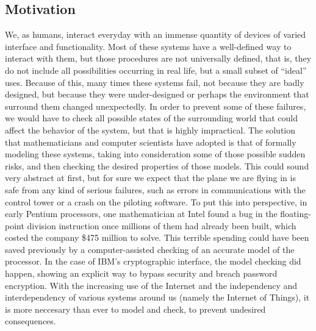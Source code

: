 \documentclass[11pt]{article}
\theoremstyle{definition}
\theoremstyle{plain}
\begin{document}
\subsection{Motivation}
We, as humans, interact everyday with an immense quantity of devices of varied interface and functionality. Most of these systems have a well-defined way to interact with them, but those procedures are not universally defined, that is, they do not include all possibilities occurring in real life, but a small subset of “ideal” uses. Because of this, many times these systems fail, not because they are badly designed, but because they were under-designed or perhaps the environment that surround them changed unexpectedly.
In order to prevent some of these failures, we would have to check all possible states of the surrounding world that could affect the behavior of the system, but that is highly impractical. The solution that mathematicians and computer scientists have adopted is that of formally modeling these systems, taking into consideration some of those possible sudden risks, and then checking the desired properties of those models.
This could sound very abstract at first, but for sure we expect that the plane we are flying in is safe from any kind of serious failures, such as errors in communications with the control tower or a crash on the piloting software.
To put this into perspective, in early Pentium processors, one mathematician at Intel found a bug in the floating-point division instruction once millions of them had already been built, which costed the company \$475 million to solve. This terrible spending could have been saved previously by a computer-assisted checking of an accurate model of the processor. In the case of IBM's cryptographic interface, the model checking did happen, showing an explicit way to bypass security and breach password encryption.
With the increasing use of the Internet and the independency and interdependency of various systems around us (namely the Internet of Things), it is more neccesary than ever to model and check, to prevent undesired consequences.
\end{document}
